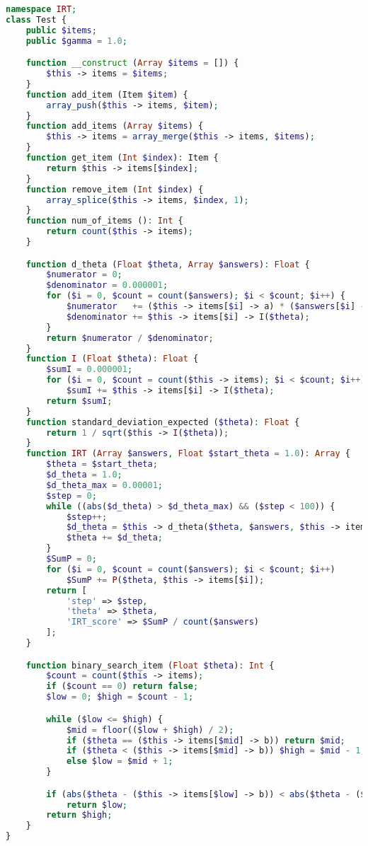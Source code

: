 \begin{lstlisting}[language=php,caption=Class bài kiểm tra]
namespace IRT;
class Test {
	public $items;
	public $gamma = 1.0;

	function __construct (Array $items = []) {
		$this -> items = $items;
	}
	function add_item (Item $item) {
		array_push($this -> items, $item);
	}
	function add_items (Array $items) {
		$this -> items = array_merge($this -> items, $items);
	}
	function get_item (Int $index): Item {
		return $this -> items[$index];
	}
	function remove_item (Int $index) {
		array_splice($this -> items, $index, 1);
	}
	function num_of_items (): Int {
		return count($this -> items);
	}

	function d_theta (Float $theta, Array $answers): Float {
		$numerator = 0;
		$denominator = 0.000001;
		for ($i = 0, $count = count($answers); $i < $count; $i++) {
			$numerator   += ($this -> items[$i] -> a) * ($answers[$i] - ($this -> items[$i] -> P($theta)));
			$denominator += $this -> items[$i] -> I($theta);
		}
		return $numerator / $denominator;
	}
	function I (Float $theta): Float {
		$sumI = 0.000001;
		for ($i = 0, $count = count($this -> items); $i < $count; $i++)
			$sumI += $this -> items[$i] -> I($theta);
		return $sumI;
	}
	function standard_deviation_expected ($theta): Float {
		return 1 / sqrt($this -> I($theta));
	}
	function IRT (Array $answers, Float $start_theta = 1.0): Array {
		$theta = $start_theta;
		$d_theta = 1.0;
		$d_theta_max = 0.00001;
		$step = 0;
		while ((abs($d_theta) > $d_theta_max) && ($step < 100)) {
			$step++;
			$d_theta = $this -> d_theta($theta, $answers, $this -> items);
			$theta += $d_theta;
		}
		$SumP = 0;
		for ($i = 0, $count = count($answers); $i < $count; $i++)
			$SumP += P($theta, $this -> items[$i]);
		return [
			'step' => $step,
			'theta' => $theta,
			'IRT_score' => $SumP / count($answers)
		];
	}

	function binary_search_item (Float $theta): Int {
		$count = count($this -> items);
		if ($count == 0) return false;
		$low = 0; $high = $count - 1;

		while ($low <= $high) {
			$mid = floor(($low + $high) / 2);
			if ($theta == ($this -> items[$mid] -> b)) return $mid;
			if ($theta < ($this -> items[$mid] -> b)) $high = $mid - 1;
			else $low = $mid + 1;
		}

		if (abs($theta - ($this -> items[$low] -> b)) < abs($theta - ($this -> items[$high] -> b)))
			return $low;
		return $high;
	}
}
\end{lstlisting}
